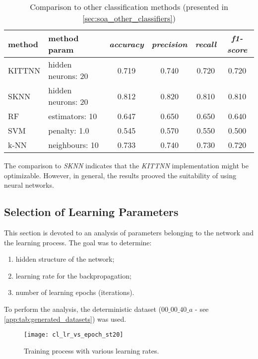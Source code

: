 \begin{table}[H]
\centering
\caption{Comparison to other classification methods (presented in \cref{sec:soa_other_classifiers})}
\label{tab:tc_comparison_to_other_classification_methods}
\begin{tabular}{|l|l|c|c|c|c|} 
\hline
method & method param & \textit{accuracy} & \textit{precision} & \textit{recall} & \textit{f1-score} \\
\hline \hline
   KITTNN 	&  hidden neurons: 20 	 &     0.719 &      0.740 &      0.720 &   0.720\\ \hline
   SKNN     &  hidden neurons: 20 	 &     0.812 &      0.820 &      0.810 &   0.810\\ \hline
   RF       &  estimators: 10		 &     0.647 &      0.650 &      0.650 &   0.640\\ \hline
   SVM      &  penalty: 1.0			 &     0.545 &      0.570 &      0.550 &   0.500\\ \hline
   k-NN     &  neighbours: 10	 	 &     0.733 &      0.740 &      0.730 &   0.720\\ \hline
\hline
\end{tabular}
\end{table}

The comparison to \textit{SKNN} indicates that the \textit{KITTNN} implementation might be optimizable. However, in general, the results prooved the suitability of using neural networks.

\subsection{Selection of Learning Parameters} \label{ssec:selection_of_learning_parameters}
This section is devoted to an analysis of parameters belonging to the network and the learning process. The goal was to determine:

\begin{enumerate}
\item hidden structure of the network;
\item learning rate for the backpropagation;
\item number of learning epochs (iterations).
\end{enumerate}

To perform the analysis, the deterministic dataset ($ 00\_00\_40\_a $ - see \cref{app:tab:generated_datasets}) was used.

\begin{figure}[H]
  \centering
  \texttt{[image: cl\_lr\_vs\_epoch\_st20]}
  \caption{Training process with various learning rates.}
  \label{fig:lr_analysis}
\end{figure}

